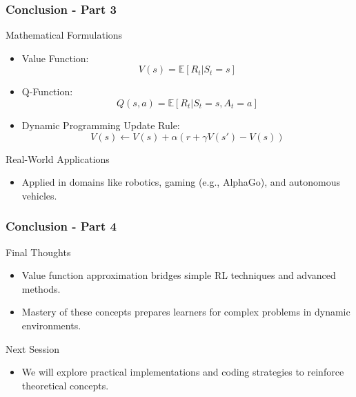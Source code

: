 \documentclass[aspectratio=169]{beamer}
\begin{document}
\begin{frame}[fragile]
    \frametitle{Conclusion - Part 3}
    \begin{block}{Mathematical Formulations}
        \begin{itemize}
            \item Value Function: 
            \begin{equation}
                V(s) = \mathbb{E}[R_t | S_t = s]
            \end{equation}
            \item Q-Function: 
            \begin{equation}
                Q(s, a) = \mathbb{E}[R_t | S_t = s, A_t = a]
            \end{equation}
            \item Dynamic Programming Update Rule: 
            \begin{equation}
                V(s) \leftarrow V(s) + \alpha (r + \gamma V(s') - V(s))
            \end{equation}
        \end{itemize}
    \end{block}
    
    \begin{block}{Real-World Applications}
        \begin{itemize}
            \item Applied in domains like robotics, gaming (e.g., AlphaGo), and autonomous vehicles.
        \end{itemize}
    \end{block}
\end{frame}

\begin{frame}[fragile]
    \frametitle{Conclusion - Part 4}
    \begin{block}{Final Thoughts}
        \begin{itemize}
            \item Value function approximation bridges simple RL techniques and advanced methods.
            \item Mastery of these concepts prepares learners for complex problems in dynamic environments.
        \end{itemize}
    \end{block}
    
    \begin{block}{Next Session}
        \begin{itemize}
            \item We will explore practical implementations and coding strategies to reinforce theoretical concepts.
        \end{itemize}
    \end{block}
\end{frame}
\end{document}
